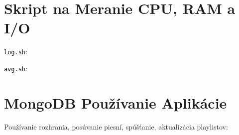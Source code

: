 \documentclass[11pt]{article}
\newif\ifknowhow
\newcommand{\ommited}{ VYNECHANÉ }
\begin{document}
\section{Skript na Meranie CPU, RAM a I/O}

\texttt{log.sh}:
\ifknowhow
\begin{code}
for i in `seq 1 300`;
do
        iotop -n 1 -k| head -1|awk '{print ($4+$10)}' 1>> io`echo $1`
        eval $(awk '/^cpu /{print "previdle=" $5 "; prevtotal=" $2+$3+$4+$5 }' \
        	/proc/stat); sleep 0.4; eval $(awk '/^cpu /{print "idle=" $5 "; \
        	total=" $2+$3+$4+$5 }' /proc/stat); intervaltotal=$((total-${prevtotal:-0}));\ 
        	echo "$((100*( (intervaltotal) - ($idle-${previdle:-0}) ) / (intervaltotal)\
        	))" 1>> cpu`echo $1`
        free -m|head -2|tail -1|awk '{print ($3*100/$2)}' 1>> ram`echo $1`
        sleep 1
done
\end{code}

\else\ommited{}\fi

\texttt{avg.sh}:
\ifknowhow
\begin{code}
cat $1|tr '\n' ' '|awk '{v=0;for(i=0;i<NF;i++) v=v+$i;; print v/NF }'
\end{code}

\else\ommited{}\fi


\section{MongoDB Používanie Aplikácie \label{poyu}}

Používanie rozhrania, posúvanie piesní, spúšťanie, aktualizácia playlistov:
\end{document}
